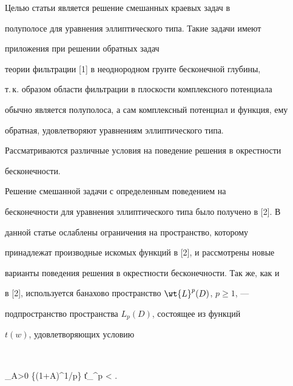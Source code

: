 

\maketitle


\label{begin}











Целью статьи является решение смешанных краевых задач в


полуполосе для уравнения эллиптического типа. Такие задачи имеют


приложения при решении обратных задач


теории фильтрации [1] в неоднородном грунте бесконечной глубины,


т.\,к. образом области фильтрации в плоскости комплексного потенциала


обычно является полуполоса, а сам комплексный потенциал и функция, ему


обратная, удовлетворяют уравнениям эллиптического типа.


Рассматриваются различные условия на поведение решения в окрестности


бесконечности.





Решение смешанной задачи с определенным поведением на


бесконечности для уравнения эллиптического типа было получено в [2]. В


данной статье ослаблены ограничения на пространство, которому


принадлежат производные искомых функций в [2], и рассмотрены новые


варианты поведения решения в окрестности бесконечности. Так же, как и


в [2], используется банахово пространство $\wt{L}^p(D)$, $p \geq 1$, ---


подпространство пространства $L_p(D)$, состоящее из функций


$t(w)$, удовлетворяющих условию


$$


\sup_{A>0} \bigg\{(1+A)^{1/p}\bigg\} \equiv \|t\|_{^p} < \infty.


